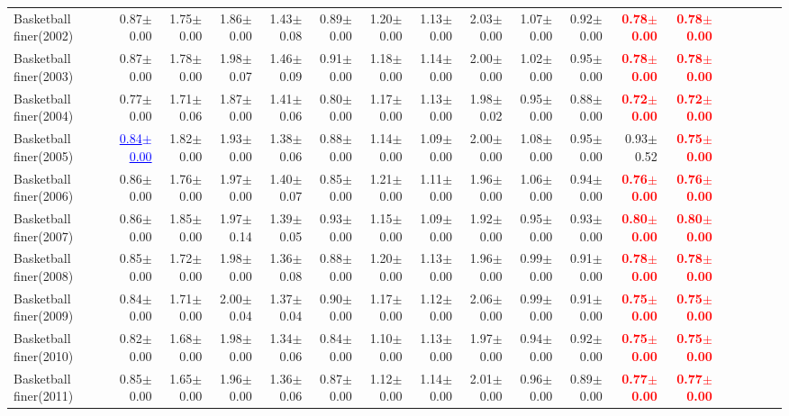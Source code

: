 \documentclass[nohyperref]{article}
\theoremstyle{plain}
\theoremstyle{definition}
\theoremstyle{remark}
\newcommand{\red}[1]{\textcolor{red}{\textbf{#1}}}
\newcommand{\blue}[1]{\textcolor{blue}{\underline{#1}}}
\begin{document}
\begin{table*}[!ht]
{\begin{tabular}{lrrrrrrrrrrrrrrrrr}
			Basketball finer(2002) & 0.87$\pm$0.00 & 1.75$\pm$0.00 & 1.86$\pm$0.00 & 1.43$\pm$0.08 & 0.89$\pm$0.00 & 1.20$\pm$0.00 & 1.13$\pm$0.00 & 2.03$\pm$0.00 & 1.07$\pm$0.00 & 0.92$\pm$0.00 & \red{0.78$\pm$0.00} & \red{0.78$\pm$0.00} \\
			Basketball finer(2003) & 0.87$\pm$0.00 & 1.78$\pm$0.00 & 1.98$\pm$0.07 & 1.46$\pm$0.09 & 0.91$\pm$0.00 & 1.18$\pm$0.00 & 1.14$\pm$0.00 & 2.00$\pm$0.00 & 1.02$\pm$0.00 & 0.95$\pm$0.00 & \red{0.78$\pm$0.00} & \red{0.78$\pm$0.00} \\
			Basketball finer(2004) & 0.77$\pm$0.00 & 1.71$\pm$0.06 & 1.87$\pm$0.00 & 1.41$\pm$0.06 & 0.80$\pm$0.00 & 1.17$\pm$0.00 & 1.13$\pm$0.00 & 1.98$\pm$0.02 & 0.95$\pm$0.00 & 0.88$\pm$0.00 & \red{0.72$\pm$0.00} & \red{0.72$\pm$0.00} \\
			Basketball finer(2005) & \blue{0.84$\pm$0.00} & 1.82$\pm$0.00 & 1.93$\pm$0.00 & 1.38$\pm$0.06 & 0.88$\pm$0.00 & 1.14$\pm$0.00 & 1.09$\pm$0.00 & 2.00$\pm$0.00 & 1.08$\pm$0.00 & 0.95$\pm$0.00 & 0.93$\pm$0.52 & \red{0.75$\pm$0.00} \\
			Basketball finer(2006) & 0.86$\pm$0.00 & 1.76$\pm$0.00 & 1.97$\pm$0.00 & 1.40$\pm$0.07 & 0.85$\pm$0.00 & 1.21$\pm$0.00 & 1.11$\pm$0.00 & 1.96$\pm$0.00 & 1.06$\pm$0.00 & 0.94$\pm$0.00 & \red{0.76$\pm$0.00} & \red{0.76$\pm$0.00} \\
			Basketball finer(2007) & 0.86$\pm$0.00 & 1.85$\pm$0.00 & 1.97$\pm$0.14 & 1.39$\pm$0.05 & 0.93$\pm$0.00 & 1.15$\pm$0.00 & 1.09$\pm$0.00 & 1.92$\pm$0.00 & 0.95$\pm$0.00 & 0.93$\pm$0.00 & \red{0.80$\pm$0.00} & \red{0.80$\pm$0.00} \\
			Basketball finer(2008) & 0.85$\pm$0.00 & 1.72$\pm$0.00 & 1.98$\pm$0.00 & 1.36$\pm$0.08 & 0.88$\pm$0.00 & 1.20$\pm$0.00 & 1.13$\pm$0.00 & 1.96$\pm$0.00 & 0.99$\pm$0.00 & 0.91$\pm$0.00 & \red{0.78$\pm$0.00} & \red{0.78$\pm$0.00} \\
			Basketball finer(2009) & 0.84$\pm$0.00 & 1.71$\pm$0.00 & 2.00$\pm$0.04 & 1.37$\pm$0.04 & 0.90$\pm$0.00 & 1.17$\pm$0.00 & 1.12$\pm$0.00 & 2.06$\pm$0.00 & 0.99$\pm$0.00 & 0.91$\pm$0.00 & \red{0.75$\pm$0.00} & \red{0.75$\pm$0.00} \\
			Basketball finer(2010) & 0.82$\pm$0.00 & 1.68$\pm$0.00 & 1.98$\pm$0.00 & 1.34$\pm$0.06 & 0.84$\pm$0.00 & 1.10$\pm$0.00 & 1.13$\pm$0.00 & 1.97$\pm$0.00 & 0.94$\pm$0.00 & 0.92$\pm$0.00 & \red{0.75$\pm$0.00} & \red{0.75$\pm$0.00} \\
			Basketball finer(2011) & 0.85$\pm$0.00 & 1.65$\pm$0.00 & 1.96$\pm$0.00 & 1.36$\pm$0.06 & 0.87$\pm$0.00 & 1.12$\pm$0.00 & 1.14$\pm$0.00 & 2.01$\pm$0.00 & 0.96$\pm$0.00 & 0.89$\pm$0.00 & \red{0.77$\pm$0.00} & \red{0.77$\pm$0.00} \\

\end{tabular}}
\end{table*}
\end{document}
